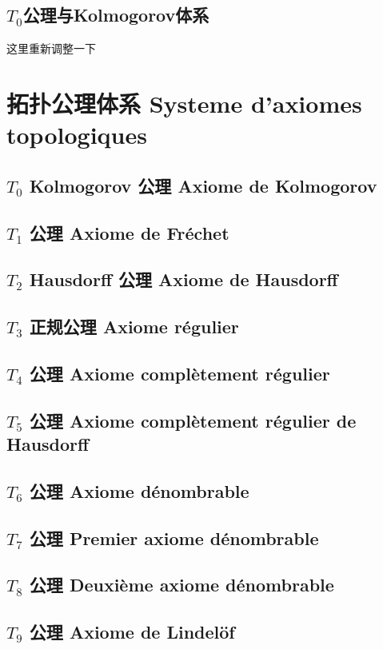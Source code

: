 \documentclass[12pt, a4paper, oneside]{ctexbook}
\begin{document}
  \subsection{$T_0$公理与Kolmogorov体系}
  这里重新调整一下

  \section{拓扑公理体系 Systeme d'axiomes topologiques}
  \subsection{$T_0$ Kolmogorov 公理 Axiome de Kolmogorov}
  \subsection{$T_1$ 公理 Axiome de Fréchet}
  \subsection{$T_2$ Hausdorff 公理 Axiome de Hausdorff}
  \subsection{$T_3$ 正规公理 Axiome régulier}
  \subsection{$T_4$ 公理 Axiome complètement régulier}
  \subsection{$T_5$ 公理 Axiome complètement régulier de Hausdorff}
  \subsection{$T_6$ 公理 Axiome dénombrable}
  \subsection{$T_7$ 公理 Premier axiome dénombrable}
  \subsection{$T_8$ 公理 Deuxième axiome dénombrable}
  \subsection{$T_9$ 公理 Axiome de Lindelöf}
\end{document}

